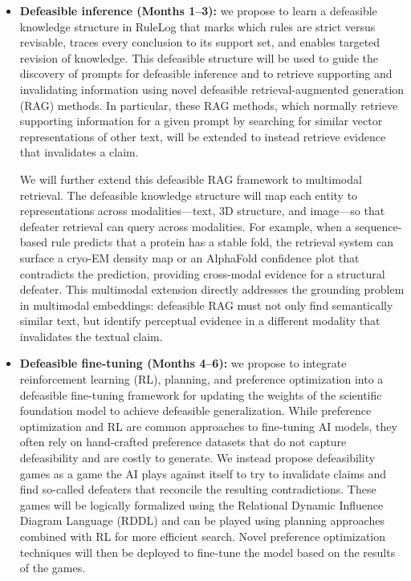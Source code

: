 \documentclass[11pt]{article}
\begin{document}
\begin{itemize}[leftmargin=1.5em]
\item \textbf{Defeasible inference (Months 1--3):} we propose to learn a defeasible knowledge structure in RuleLog that marks which rules are strict versus revisable, traces every conclusion to its support set, and enables targeted revision of knowledge. This defeasible structure will be used to guide the discovery of prompts for defeasible inference and to retrieve supporting and invalidating information using novel defeasible retrieval-augmented generation (RAG) methods. In particular, these RAG methods, which normally retrieve supporting information for a given prompt by searching for similar vector representations of other text, will be extended to instead retrieve evidence that invalidates a claim.

We will further extend this defeasible RAG framework to multimodal retrieval. The defeasible knowledge structure will map each entity to representations across modalities---text, 3D structure, and image---so that defeater retrieval can query across modalities. For example, when a sequence-based rule predicts that a protein has a stable fold, the retrieval system can surface a cryo-EM density map or an AlphaFold confidence plot that contradicts the prediction, providing cross-modal evidence for a structural defeater. This multimodal extension directly addresses the grounding problem in multimodal embeddings: defeasible RAG must not only find semantically similar text, but identify perceptual evidence in a different modality that invalidates the textual claim.

\item \textbf{Defeasible fine-tuning (Months 4--6):} we propose to integrate reinforcement learning (RL), planning, and preference optimization into a defeasible fine-tuning framework for updating the weights of the scientific foundation model to achieve defeasible generalization. While preference optimization and RL are common approaches to fine-tuning AI models, they often rely on hand-crafted preference datasets that do not capture defeasibility and are costly to generate. We instead propose defeasibility games as a game the AI plays against itself to try to invalidate claims and find so-called defeaters that reconcile the resulting contradictions. These games will be logically formalized using the Relational Dynamic Influence Diagram Language (RDDL) and can be played using planning approaches combined with RL for more efficient search. Novel preference optimization techniques will then be deployed to fine-tune the model based on the results of the games.


\end{itemize}
\end{document}
